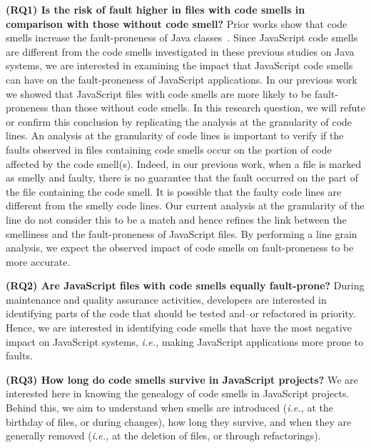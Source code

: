 \documentclass[smallcondensed]{svjour3}
\newcommand{\ie}{{\textit{i.e.,}}}
\begin{document}
\textbf{(RQ1) Is the risk of fault higher in files with code smells in comparison with those without code smell?}
Prior works show that code smells increase the fault-proneness of Java classes~\cite{Khomh2012,jaafar2013mining}. Since JavaScript code smells are different from the code smells investigated in these previous studies on Java systems, we are interested in examining the impact that JavaScript code smells can have on the fault-proneness of JavaScript applications. In our previous work~\cite{saboury2017empirical} we showed that JavaScript files with code smells are more likely to be fault-proneness than those without code smells. In this research question, we will refute or confirm this conclusion by replicating the analysis at the granularity of code lines. An analysis at the granularity of code lines is important to verify if the faults observed in files containing code smells occur on the portion of code affected by the code smell(s). {\color{blue}Indeed, in our previous work, when a file is marked as smelly and faulty, there is no guarantee that the fault occurred on the part of the file containing the code smell. %
It is possible that the faulty code lines are different from the smelly code lines. Our current analysis at the granularity of the line do not consider this to be a match and hence refines the link between the smelliness and the fault-proneness of JavaScript files. By performing a line grain analysis, we expect the observed impact of code smells on fault-proneness to be more accurate.} %

\textbf{(RQ2) Are JavaScript files with code smells equally fault-prone?}
During maintenance and quality assurance activities, developers are interested in identifying parts of the code that should be tested and--or refactored in priority. Hence, we are interested in identifying code smells that have the most negative impact on JavaScript systems, \ie{} making JavaScript applications more prone to faults.

\textbf{(RQ3) How long do code smells survive in JavaScript projects?}
We are interested here in knowing the genealogy of code smells in JavaScript projects. {\color{blue}Behind this, we aim to understand when smells are introduced (\ie{} at the birthday of files, or during changes), how long they survive, and when they are generally removed (\ie{} at the deletion of files, or through refactorings).}
\end{document}
